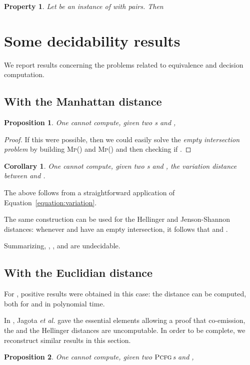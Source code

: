 \documentclass[submission]{eptcs} \usepackage{breakurl}             \usepackage[english]{babel}
\newtheorem{property}{Property}
\newtheorem{proposition}{Proposition}
\newtheorem{corollary}{Corollary}
\providecommand{\PCFG}{\ensuremath{\textsc{Pcfg}}}
\begin{document}
\begin{property}\label{tac_for_pcp}
Let  be an instance of  with  pairs. Then

\end{property}




\section{Some decidability results}\label{sec:res}
We report results concerning the problems related to equivalence and decision computation. 
\subsection{With the Manhattan distance}
\begin{proposition}
One cannot compute, given two s  and ,

\end{proposition}
\begin{proof}
If this were possible, then we could easily solve the \emph{empty intersection problem} by building  \textsc{Mp}() and \textsc{Mp}() and then checking if .
\end{proof}
\begin{corollary}
One cannot compute, given two s  and , the variation distance between  and .
\end{corollary}
The above follows from a straightforward application of Equation~\ref{equation:variation}.

The same construction can be used for the Hellinger and Jenson-Shannon distances: whenever  and  have an empty intersection, it follows that  and .

Summarizing, , ,  and   are undecidable.

\subsection{With the Euclidian distance}
For , positive results were obtained in this case: the distance can be computed, both for  and  in polynomial time\cite{lyng99}.

In \cite{jago01}, Jagota \textit{et al.} gave the essential elements allowing a proof that co-emission, the  and the Hellinger distances are uncomputable. In order to be complete, we reconstruct similar results in this section.

\begin{proposition}
One cannot compute, given two {\PCFG}s  and ,

\end{proposition}
\end{document}
